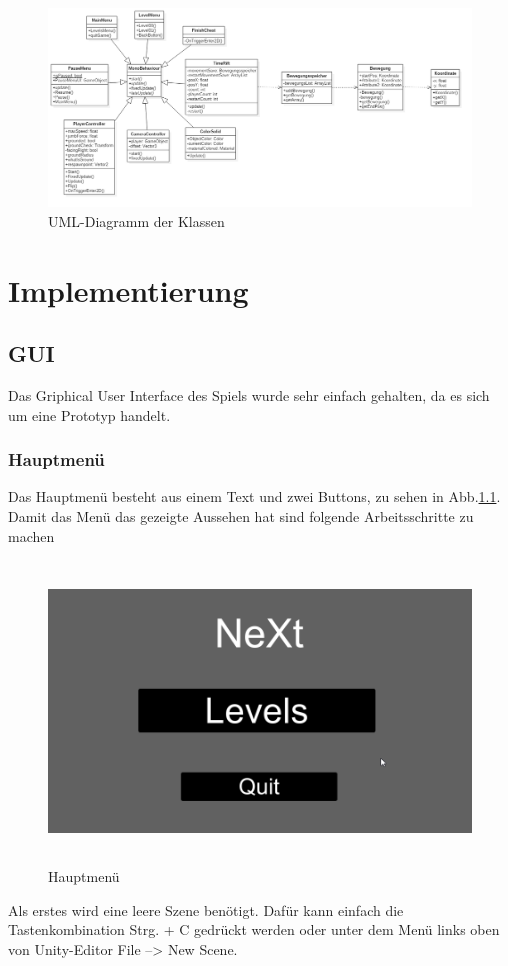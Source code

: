 \begin{figure}[H]
	\centering
	\includegraphics[width=15cm]{images/UML.png}
	\caption{UML-Diagramm der Klassen}		
\end{figure}

\chapter{Implementierung}
\section{GUI}
Das Griphical User Interface des Spiels wurde sehr einfach gehalten, da es sich um eine Prototyp handelt.
\subsection{Hauptmenü}
Das Hauptmenü besteht aus einem Text und zwei Buttons, zu sehen in Abb.\ref{Mainmenu}. Damit das Menü das gezeigte Aussehen hat sind folgende Arbeitsschritte zu machen

\begin{figure}[H]
	\centering
	\includegraphics[height=8cm]{images/Mainmenu.png}
	\caption{Hauptmenü}
	\label{Mainmenu}
\end{figure}
Als erstes wird eine leere Szene benötigt. Dafür kann einfach die Tastenkombination Strg. + C gedrückt werden oder unter dem Menü links oben von Unity-Editor File --> New Scene.

